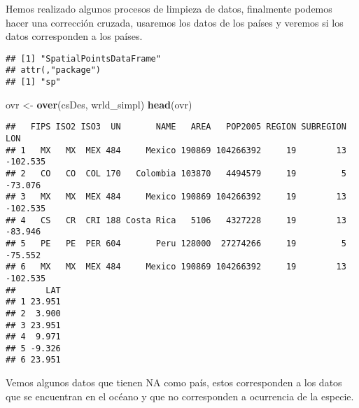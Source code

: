 \documentclass[]{article}
\newenvironment{Shaded}{\begin{snugshade}}{\end{snugshade}}
\newcommand{\KeywordTok}[1]{\textcolor[rgb]{0.13,0.29,0.53}{\textbf{{#1}}}}
\newcommand{\DataTypeTok}[1]{\textcolor[rgb]{0.13,0.29,0.53}{{#1}}}
\newcommand{\DecValTok}[1]{\textcolor[rgb]{0.00,0.00,0.81}{{#1}}}
\newcommand{\StringTok}[1]{\textcolor[rgb]{0.31,0.60,0.02}{{#1}}}
\newcommand{\CommentTok}[1]{\textcolor[rgb]{0.56,0.35,0.01}{\textit{{#1}}}}
\newcommand{\ErrorTok}[1]{\textcolor[rgb]{0.64,0.00,0.00}{\textbf{{#1}}}}
\newcommand{\NormalTok}[1]{{#1}}
\begin{document}
Hemos realizado algunos procesos de limpieza de datos, finalmente
podemos hacer una corrección cruzada, usaremos los datos de los países y
veremos si los datos corresponden a los países.

\begin{Shaded}
\end{Shaded}

\begin{verbatim}
## [1] "SpatialPointsDataFrame"
## attr(,"package")
## [1] "sp"
\end{verbatim}

\begin{Shaded}
\begin{Highlighting}[]
\NormalTok{ovr <-}\StringTok{ }\KeywordTok{over}\NormalTok{(csDes, wrld_simpl)}
\KeywordTok{head}\NormalTok{(ovr)}
\end{Highlighting}
\end{Shaded}

\begin{verbatim}
##   FIPS ISO2 ISO3  UN       NAME   AREA   POP2005 REGION SUBREGION      LON
## 1   MX   MX  MEX 484     Mexico 190869 104266392     19        13 -102.535
## 2   CO   CO  COL 170   Colombia 103870   4494579     19         5  -73.076
## 3   MX   MX  MEX 484     Mexico 190869 104266392     19        13 -102.535
## 4   CS   CR  CRI 188 Costa Rica   5106   4327228     19        13  -83.946
## 5   PE   PE  PER 604       Peru 128000  27274266     19         5  -75.552
## 6   MX   MX  MEX 484     Mexico 190869 104266392     19        13 -102.535
##      LAT
## 1 23.951
## 2  3.900
## 3 23.951
## 4  9.971
## 5 -9.326
## 6 23.951
\end{verbatim}

Vemos algunos datos que tienen NA como país, estos corresponden a los
datos que se encuentran en el océano y que no corresponden a ocurrencia
de la especie.

\begin{Shaded}
\end{Shaded}
\end{document}

